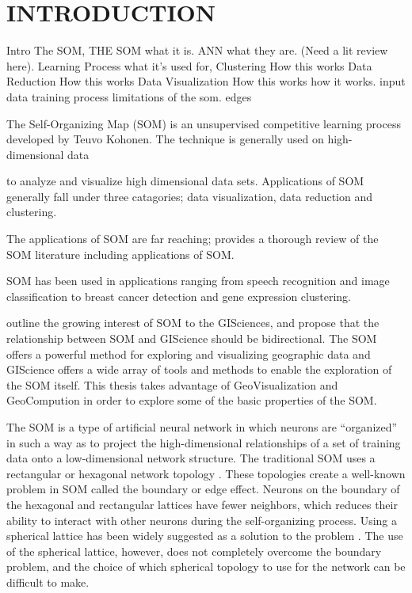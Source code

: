 \chapter{INTRODUCTION}



Intro The SOM, 
	THE SOM
		what it is.
			ANN
				what they are. (Need a lit review here).
			Learning Process
		what it's used for, 
			Clustering
				How this works
			Data Reduction
				How this works
			Data Visualization
				How this works
		how it works.
			input data
			training process
		limitations of the som.
			edges
		

The Self-Organizing Map (SOM) is an unsupervised competitive learning process
developed by Teuvo Kohonen.
The technique is generally used on high-dimensional data

to analyze and visualize high dimensional data sets.  
Applications of SOM generally fall under three catagories; data visualization, data reduction and clustering.  



The applications of SOM are far reaching; \cite{Kohonen2000} provides a thorough review of the SOM literature including applications of SOM.  

SOM has been used in applications ranging from speech recognition and image classification to breast cancer detection and gene expression clustering.  

\cite{skupin08} outline the growing interest of SOM to
the GISciences, and propose that the relationship between SOM and GIScience
should be bidirectional.  The SOM offers a powerful method for exploring and
visualizing geographic data and GIScience offers a wide array of tools
and methods to enable the exploration of the SOM itself.  This thesis takes
advantage of GeoVisualization and GeoCompution in order to explore some of the basic
properties of the SOM.

The SOM is a type of artificial neural network in which neurons are ``organized''
in such a way as to project the high-dimensional relationships of a set of
training data onto a low-dimensional network structure.  The traditional
SOM uses a rectangular or hexagonal network topology \citep{Kohonen2000}.  These topologies 
create a well-known problem in SOM called the boundary or edge effect.  Neurons on
the boundary of the hexagonal and rectangular lattices have fewer neighbors,
which reduces their ability to interact with other neurons during the
self-organizing process.  Using a spherical lattice has been widely suggested as a
solution to the problem \citep{ritter99, boudjemai2003, sangole03,
Nishio:2006fk, wu2006}. The use of the spherical lattice, however, does not
completely overcome the boundary problem, and the choice of which spherical
topology to use for the network can be difficult to make.

